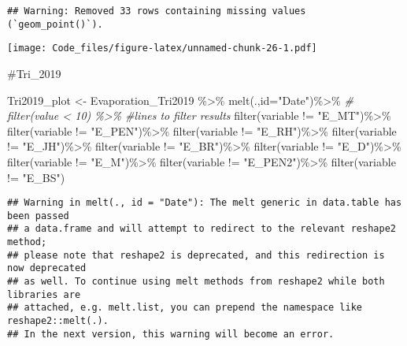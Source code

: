 \documentclass[
]{article}
\newenvironment{Shaded}{\begin{snugshade}}{\end{snugshade}}
\newcommand{\AttributeTok}[1]{\textcolor[rgb]{0.77,0.63,0.00}{#1}}
\newcommand{\CommentTok}[1]{\textcolor[rgb]{0.56,0.35,0.01}{\textit{#1}}}
\newcommand{\FunctionTok}[1]{\textcolor[rgb]{0.00,0.00,0.00}{#1}}
\newcommand{\NormalTok}[1]{#1}
\newcommand{\OtherTok}[1]{\textcolor[rgb]{0.56,0.35,0.01}{#1}}
\newcommand{\SpecialCharTok}[1]{\textcolor[rgb]{0.00,0.00,0.00}{#1}}
\newcommand{\StringTok}[1]{\textcolor[rgb]{0.31,0.60,0.02}{#1}}
\begin{document}
\begin{verbatim}
## Warning: Removed 33 rows containing missing values (`geom_point()`).
\end{verbatim}

\texttt{[image: Code\_files/figure-latex/unnamed-chunk-26-1.pdf]}

\#Tri\_2019

\begin{Shaded}
\begin{Highlighting}[]
\NormalTok{Tri2019\_plot }\OtherTok{\textless{}{-}}\NormalTok{ Evaporation\_Tri2019 }\SpecialCharTok{\%\textgreater{}\%} 
  \FunctionTok{melt}\NormalTok{(.,}\AttributeTok{id=}\StringTok{"Date"}\NormalTok{)}\SpecialCharTok{\%\textgreater{}\%} 
 \CommentTok{\# filter(value \textless{} 10) \%\textgreater{}\%               \#lines to filter results}
  \FunctionTok{filter}\NormalTok{(variable }\SpecialCharTok{!=} \StringTok{"E\_MT"}\NormalTok{)}\SpecialCharTok{\%\textgreater{}\%}
  \FunctionTok{filter}\NormalTok{(variable }\SpecialCharTok{!=} \StringTok{"E\_PEN"}\NormalTok{)}\SpecialCharTok{\%\textgreater{}\%}
  \FunctionTok{filter}\NormalTok{(variable }\SpecialCharTok{!=} \StringTok{"E\_RH"}\NormalTok{)}\SpecialCharTok{\%\textgreater{}\%}
  \FunctionTok{filter}\NormalTok{(variable }\SpecialCharTok{!=} \StringTok{"E\_JH"}\NormalTok{)}\SpecialCharTok{\%\textgreater{}\%}
  \FunctionTok{filter}\NormalTok{(variable }\SpecialCharTok{!=} \StringTok{"E\_BR"}\NormalTok{)}\SpecialCharTok{\%\textgreater{}\%}
  \FunctionTok{filter}\NormalTok{(variable }\SpecialCharTok{!=} \StringTok{"E\_D"}\NormalTok{)}\SpecialCharTok{\%\textgreater{}\%}
  \FunctionTok{filter}\NormalTok{(variable }\SpecialCharTok{!=} \StringTok{"E\_M"}\NormalTok{)}\SpecialCharTok{\%\textgreater{}\%}
  \FunctionTok{filter}\NormalTok{(variable }\SpecialCharTok{!=} \StringTok{"E\_PEN2"}\NormalTok{)}\SpecialCharTok{\%\textgreater{}\%}
  \FunctionTok{filter}\NormalTok{(variable }\SpecialCharTok{!=} \StringTok{"E\_BS"}\NormalTok{)}
\end{Highlighting}
\end{Shaded}

\begin{verbatim}
## Warning in melt(., id = "Date"): The melt generic in data.table has been passed
## a data.frame and will attempt to redirect to the relevant reshape2 method;
## please note that reshape2 is deprecated, and this redirection is now deprecated
## as well. To continue using melt methods from reshape2 while both libraries are
## attached, e.g. melt.list, you can prepend the namespace like reshape2::melt(.).
## In the next version, this warning will become an error.
\end{verbatim}
\end{document}

